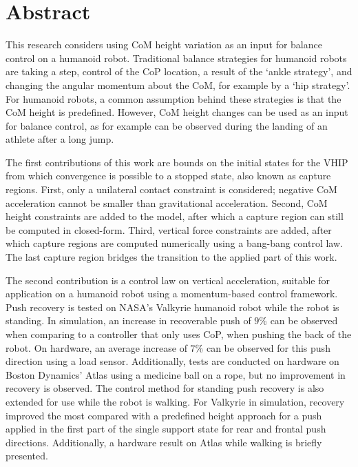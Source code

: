 %
\chapter*{Abstract}%

This research considers using \ac{CoM} height variation as an input for balance control on a humanoid robot. Traditional balance strategies for humanoid robots are taking a step, control of the \ac{CoP} location, a result of the `ankle strategy', and changing the angular momentum about the \ac{CoM}, for example by a `hip strategy'. For humanoid robots, a common assumption behind these strategies is that the \ac{CoM} height is predefined. However, \ac{CoM} height changes can be used as an input for balance control, as for example can be observed during the landing of an athlete after a long jump. 

The first contributions of this work are bounds on the initial states for the \ac{VHIP} from which convergence is possible to a stopped state, also known as capture regions. First, only a unilateral contact constraint is considered; negative \ac{CoM} acceleration cannot be smaller than gravitational acceleration. Second, \ac{CoM} height constraints are added to the model, after which a capture region can still be computed in closed-form. Third, vertical force constraints are added, after which capture regions are computed numerically using a bang-bang control law. The last capture region bridges the transition to the applied part of this work.

The second contribution is a control law on vertical acceleration, suitable for application on a humanoid robot using a momentum-based control framework. Push recovery is tested on NASA's Valkyrie humanoid robot while the robot is standing. In simulation, an increase in recoverable push of $9$\% can be observed when comparing to a controller that only uses \ac{CoP}, when pushing the back of the robot. On hardware, an average increase of $7$\% can be observed for this push direction using a load sensor. Additionally, tests are conducted on hardware on Boston Dynamics' Atlas using a medicine ball on a rope, but no improvement in recovery is observed. The control method for standing push recovery is also extended for use while the robot is walking. For Valkyrie in simulation, recovery improved the most compared with a predefined height approach for a push applied in the first part of the single support state for rear and frontal push directions. Additionally, a hardware result on Atlas while walking is briefly presented.